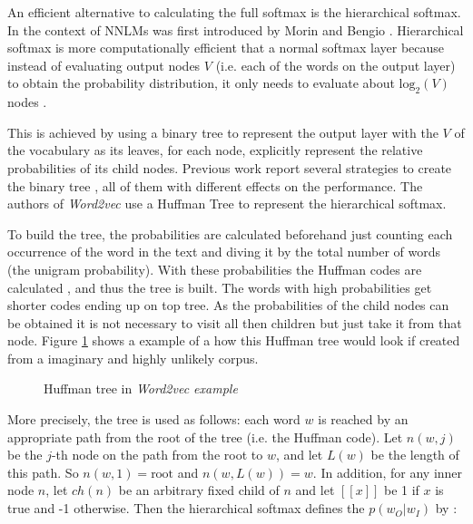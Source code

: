An efficient alternative to calculating the full softmax is the hierarchical
softmax. In the context of \ac{NNLM}s was first introduced by Morin and
Bengio \cite{Morin05hierarchicalprobabilistic}. Hierarchical softmax is more
computationally efficient that a normal softmax layer because instead of
evaluating output nodes $V$ (i.e. each of the words on the output layer) to
obtain the probability distribution, it only needs to evaluate about
$\text{log}_2 \left( V \right)$ nodes \cite{MikolovSCCD13}.

This is achieved by  using a binary tree to represent the output layer with
the $V$ of the vocabulary as its leaves, for each node, explicitly represent
the relative probabilities of its child nodes. Previous work report several
strategies to create the binary tree \cite{Mnih08ascalable}, all of them with
different effects on the performance. The authors of \textit{Word2vec} use a Huffman Tree  to represent the
hierarchical softmax.

To build the tree, the probabilities are calculated beforehand just counting
each occurrence of  the word in the text
and diving it by the total number of words (the unigram probability).  With these probabilities the
Huffman codes are calculated \cite{huf52}, and thus the tree is built. The
words with high probabilities get shorter codes ending up on top tree. As the
probabilities of the child nodes can be obtained it is not necessary to visit
all then children but just take it from that node. Figure
\ref{fig:huffam-tree-w2v-example} shows a example of a how this Huffman tree
would look if  created from a imaginary and  highly unlikely corpus. 




\begin{figure}[h]
    \centering
    \caption{Huffman tree in \textit{Word2vec example}}
    \label{fig:huffam-tree-w2v-example}
\end{figure}

More precisely, the tree is used as follows: each word $w$ is reached by an
appropriate path from the root of the tree (i.e. the Huffman code). Let
$n(w,j)$ be the $j$-th node on the path from the root to $w$, and let $L(w)$
be the length of this path. So $n(w,1) = \text{root}$ and $n(w,L(w)) = w$. In
addition, for any inner node $n$, let $ch(n)$ be an arbitrary fixed child of
$n$ and let $[\![ x ]\!] $ be 1 if $x$ is true and -1 otherwise. Then the
hierarchical softmax defines the $p(w_O|w_I)$  by \cite{MikolovSCCD13} : 


